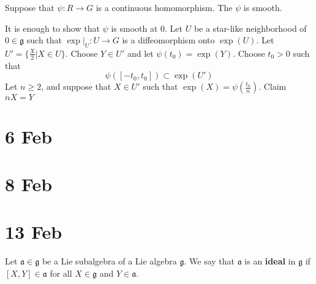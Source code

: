 \documentclass[11pt,a4paper]{scrarticle}
\theoremstyle{definition}
\renewenvironment{proof}[1][\proofname]{\vspace{-15pt}\begin{myproof}}{\end{myproof}}
\theoremstyle{greenbox}
\newcommand{\ag}{\mathfrak{a}}
\newcommand{\fg}{\mathfrak{g}}
\begin{document}
\begin{thm}
    Suppose that $ \psi : R \to G $ is a continuous homomorphism. The $ \psi $ is smooth.
\end{thm}
\begin{proof}
    It is enough to show that $ \psi $ is smooth at $ 0 $. Let $ U $ be a star-like neighborhood of $ 0 \in \fg $ such that $ \exp|_{U}  :U \to G $ is a diffeomorphism onto $ \exp(U) $. Let $ U' = \{\frac{X}{2} | X \in U\} $. Choose $ Y \in U' $ and let $ \psi(t_{0}) = \exp(Y) $. Choose $ t_{0} > 0  $ such that 
    \[ \psi([-t_{0},t_{0}]) \subset \exp(U') \]
    Let $ n \ge 2 $, and suppose that $ X \in U'
     $ such that $ \exp(X) = \psi(  \frac{t_{0}}{n}) $. Claim $ nX = Y $
\end{proof}
\section{6 Feb}
\section{8 Feb}
\section{13 Feb}

\vspace{0.5cm}
\begin{defn}
    Let $ \mathfrak{a} \in \fg $ be a Lie subalgebra of a Lie algebra $ \fg $. We say that $ \ag $ is an \textbf{ideal} in $ \fg $ if $ [X,Y] \in \ag $ for all $ X \in \fg $ and $ Y \in \ag $. 
\end{defn}
\end{document}
